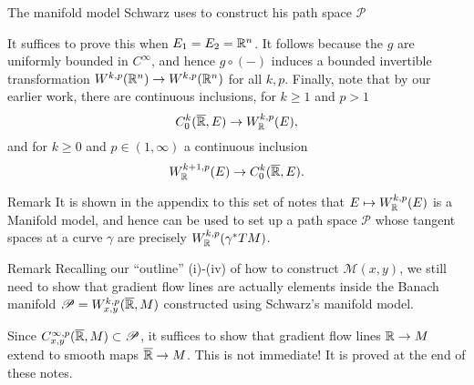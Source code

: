 \documentclass{amsart}
\begin{document}
\begin{clear}{The manifold model Schwarz uses to construct his path
    space $\mathscr{P}$}
\begin{defn}
  It suffices to prove this when $E_{1}=E_{2}=\mathbb{R}^{n}$. It follows because the $g$ are uniformly bounded in $C^{\infty}$, and hence $g\circ (-)$ induces a bounded invertible transformation $W^{k,p}(\mathbb{R}^{n})\to W^{k,p}(\mathbb{R}^{n})$ for all $k,p$. Finally, note that by our earlier work, there are continuous inclusions, for $k\ge 1$ and $p>1$
  \begin{equation*}
    C^{k}_{0}(\overline{\mathbb{R}},E)\to W^{k,p}_{\mathbb{R}}(E),
  \end{equation*}
  and for $k\ge 0$ and $p\in (1,\infty)$ a continuous inclusion
  \begin{equation*}
    W^{k+1,p}_{\mathbb{R}}(E)\to C^{k}_{0}(\overline{\mathbb{R}},E).
  \end{equation*}
\end{defn}
\begin{clear}{Remark}
  It is shown in the appendix to this set of notes that $E\mapsto
  W^{k,p}_{\mathbb{R}}(E)$ is a Manifold model, and hence can be used to set
  up a path space $\mathscr{P}$ whose tangent spaces at a curve
  $\gamma$ are precisely $W^{k,p}_{\mathbb{R}}(\gamma^{*}TM)$.
\end{clear}
\end{clear}
\begin{clear}{Remark}
Recalling our ``outline'' (i)-(iv)
  of how to construct $\mathscr{M}(x,y)$, we still need to show that
  gradient flow lines are actually elements inside the Banach manifold
  $\mathscr{P}=W^{k,p}_{x,y}(\overline{\mathbb{R}},M)$ constructed using
  Schwarz's manifold model.

  Since $C^{\infty,p}_{x,y}(\overline{\mathbb{R}},M)\subset \mathscr{P}$, it
  suffices to show that gradient flow lines $\mathbb{R}\to M$ extend to smooth
  maps $\overline{\mathbb{R}}\to M$. This is not immediate! It is proved at the
  end of these notes.
\end{clear}
\end{document}
